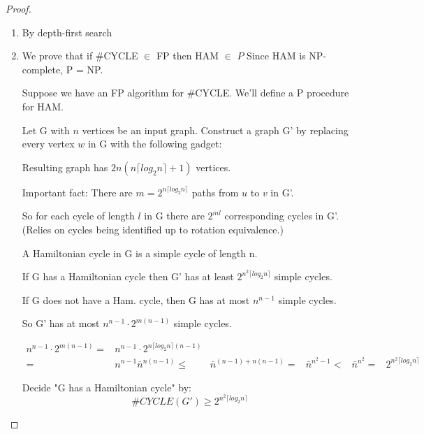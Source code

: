 \documentclass[a4paper,12pt]{article}
\theoremstyle{definition}
\theoremstyle{remark}
\begin{document}
\begin{proof}
    \begin{enumerate}
        \item By depth-first search
        \item We prove that if $\#$CYCLE $\in$ FP then HAM $\in$ $P$
        Since HAM is NP-complete, P = NP.

        Suppose we have an FP algorithm for $\#$CYCLE. We'll define a P procedure for HAM.

        Let G with $n$ vertices be an input graph. Construct a graph G' by replacing every vertex $w$ in G with the following gadget:


        Resulting graph has $2n(n \lceil log_2 n \rceil + 1)$ vertices.

        Important fact: There are $m = 2^{n \lceil log_2 n \rceil}$ paths from $u$ to $v$ in G'.

        So for each cycle of length $l$ in G there are $2^{ml}$ corresponding cycles in G'.
        (Relies on cycles being identified up to rotation equivalence.) 

        A Hamiltonian cycle in G is a simple cycle of length n.

        If G has a Hamiltonian cycle then G' has at least $2^{n^2 \lceil log_2 n \rceil}$ simple cycles.

        If G does not have a Ham. cycle, then G has at most $n^{n-1}$ simple cycles.

        So G' has at most $n^{n-1} \cdot 2^{m (n-1)}$ simple cycles.

        \begin{align*}
            n^{n-1} \cdot 2^{m (n-1)} =& n^{n-1} \cdot 2^{n \lceil log_2 n \rceil (n-1)} \\
                                      =& n^{n-1} \bar{n}^{n (n - 1)}
                                      \leq& \bar{n}^{(n-1) + n (n-1)}
                                      =& \bar{n}^{n^2 - 1}
                                      <& \bar{n}^{n^2}
                                      =& 2^{n^2 \lceil log_2 n \rceil} 
        \end{align*}

        Decide "G has a Hamiltonian cycle" by:
        \begin{equation*}
            \#CYCLE(G') \geq 2^{n^2 \lceil log_2 n \rceil} 
        \end{equation*}
    \end{enumerate}
\end{proof}
\end{document}
